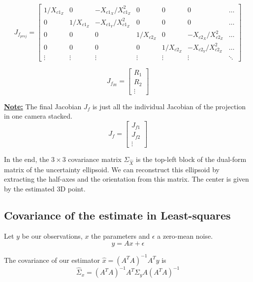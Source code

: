 \begin{equation}
   J_{f_{proj}} = \left[\begin{array}{ccccccc}
       1/X_{c1_Z} & 0 & - X_{c1_X}/X^2_{c1_Z} &0&0&0&\hdots \\
       0 & 1/X_{c1_Z} & - X_{c1_Y}/X^2_{c1_Z} &0&0&0&\hdots \\
       0&0&0& 1/X_{c2_Z} & 0 & - X_{c2_X}/X^2_{c2_Z} &\hdots \\
       0&0&0& 0 & 1/X_{c2_Z} & - X_{c2_Y}/X^2_{c2_Z} &\hdots \\
       \vdots & \vdots & \vdots & \vdots & \vdots & \vdots & \ddots
   \end{array}\right]
\end{equation}

\begin{equation}
    J_{f_{Rt}} = \left[\begin{array}{c}
        R_1 \\ R_2 \\ \vdots
    \end{array}\right]
\end{equation}

\textbf{\underline{Note:}} The final Jacobian $J_f$ is just all the individual Jacobian of the projection in one camera stacked.
\begin{equation}
    J_f = \left[\begin{array}{c}
        J_{f1} \\ J_{f2} \\ \vdots
    \end{array}\right]
\end{equation}

In the end, the $3\times3$ covariance matrix $\Sigma_{\hat{X}}$ is the top-left block of the dual-form matrix of the uncertainty ellipsoid. We can reconstruct this ellipsoid by extracting the half-axes and the orientation from this matrix. The center is given by the estimated 3D point.


\subsection{Covariance of the estimate in Least-squares}
Let $y$ be our observations, $x$ the parameters and $\epsilon$ a zero-mean noise.
\begin{equation}
    y = Ax+\epsilon
\end{equation}

The covariance of our estimator $\hat{x} = (A^T A)^{-1} A^T y$ is
\begin{equation}
    \hat{\Sigma}_x = (A^T A)^{-1} A^T \Sigma_y A (A^T A)^{-1}
\end{equation}

